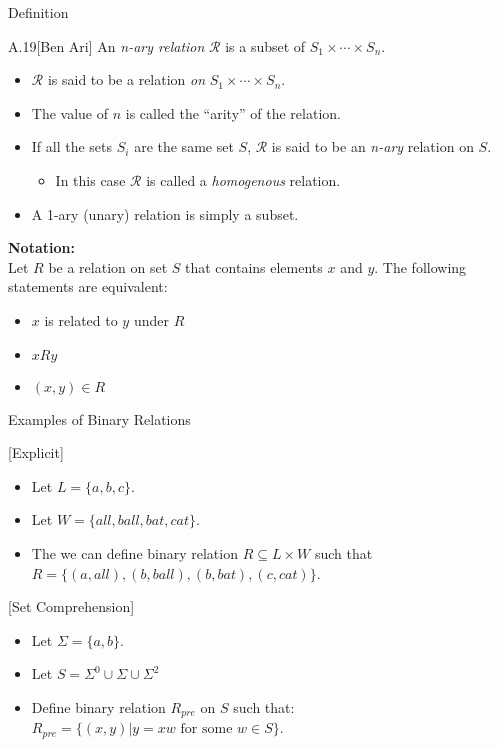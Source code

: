 \begin{slide}[bm=,toc=]{Definition}
\begin{defn}{A.19}[Ben Ari]
An \emph{n-ary relation} $\mathcal{R}$ is a subset of $S_1 \times \cdots \times
S_n$. 
\begin{itemize}
\item $\mathcal{R}$ is said to be a relation \emph{on} $S_1 \times \cdots \times
S_n$.
\item The value of $n$ is called the ``arity'' of the relation.
\item If all the sets $S_i$ are the same set $S$, $\mathcal{R}$ is said to be
an \emph{n-ary} relation on $S$.
\begin{itemize}
\item In this case $\mathcal{R}$ is called a \emph{homogenous} relation.
\end{itemize}
\item A 1-ary (unary) relation is simply a subset.
\end{itemize}
\end{defn}
\vspace{-3mm}
\textbf{Notation:}~\\
Let $R$ be a relation on set $S$ that contains elements $x$ and $y$. 
The following statements are equivalent: 
\begin{itemize}
\item $x$ is related to $y$ under $R$
\item $xRy$
\item $(x,y) \in R$
\end{itemize}
\end{slide}

\begin{slide}[bm=,toc=]{Examples of Binary Relations}
\begin{ex}{}[Explicit]~\\
\begin{itemize}
\item Let $L = \{a,b,c\}$.
\item Let $W = \{all,ball,bat,cat\}$.
\item The we can define binary relation $R \subseteq L \times W$ such that 
      $R = \{(a,all),(b,ball),(b, bat), (c,cat)\}$.
\end{itemize}
\end{ex}
\begin{ex}{}[Set Comprehension]~\\
\begin{itemize}
\item Let $\Sigma = \{a,b\}$.
\item Let $S = \Sigma^0 \cup \Sigma \cup \Sigma^2$
\item Define binary relation $R_{pre}$ on $S$ such that:
      $R_{pre} = \{(x,y)| y = xw \text{ for some } w \in S \}$.
\end{itemize}
\end{ex}

\end{slide}

